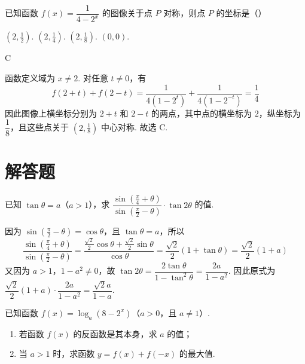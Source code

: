 \begin{problem}
已知函数 \(f(x)=\dfrac{1}{4-2^x}\) 的图像关于点 \(P\) 对称，则点 \(P\) 的坐标是（\quad）

\choices
    {\(\left(2,\frac{1}{2}\right)\).}
    {\(\left(2,\frac{1}{4}\right)\).}
    {\(\left(2,\frac{1}{8}\right)\).}
    {\((0,0)\).}
\end{problem}

\begin{answer}
C
\end{answer}

\begin{solution}
函数定义域为 \(x\ne2\). 对任意 \(t\ne0\)，有
\[
f(2+t)+f(2-t)=\frac{1}{4(1-2^t)}+\frac{1}{4(1-2^{-t})}=\frac14
\]
因此图像上横坐标分别为 \(2+t\) 和 \(2-t\) 的两点，其中点的横坐标为 \(2\)，纵坐标为 \(\dfrac18\)，且这些点关于 \((2,\frac18)\) 中心对称. 故选 C.
\end{solution}

\section{解答题}

\begin{problem}
已知 \(\tan\theta=a\)（\(a>1\)），求 \(\dfrac{\sin\left(\frac{\pi}{4}+\theta\right)}{\sin\left(\frac{\pi}{2}-\theta\right)}\cdot\tan2\theta\) 的值.
\end{problem}

\begin{solution}
因为 \(\sin\left(\frac\pi2-\theta\right)=\cos\theta\)，且 \(\tan\theta=a\)，所以
\[
\frac{\sin\left(\frac\pi4+\theta\right)}{\sin\left(\frac\pi2-\theta\right)}=\frac{\frac{\sqrt2}{2}\cos\theta+\frac{\sqrt2}{2}\sin\theta}{\cos\theta}=\frac{\sqrt2}{2}(1+\tan\theta)=\frac{\sqrt2}{2}(1+a)
\]
又因为 \(a>1\)，\(1-a^2\ne0\)，故 \(\tan2\theta=\dfrac{2\tan\theta}{1-\tan^2\theta}=\dfrac{2a}{1-a^2}\). 因此原式为 \(\dfrac{\sqrt2}{2}(1+a)\cdot\dfrac{2a}{1-a^2}=\dfrac{\sqrt2 a}{1-a}\).
\end{solution}

\begin{problem}
已知函数 \(f(x)=\log_a(8-2^x)\)（\(a>0\)，且 \(a\ne1\)）.

\begin{enumerate}
\item 若函数 \(f(x)\) 的反函数是其本身，求 \(a\) 的值；
\item 当 \(a>1\) 时，求函数 \(y=f(x)+f(-x)\) 的最大值.
\end{enumerate}
\end{problem}


